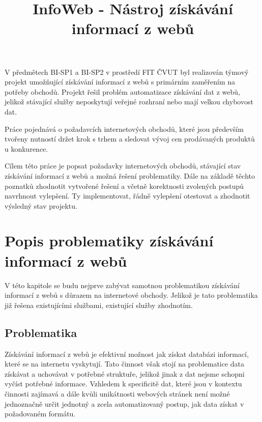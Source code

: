\documentclass[thesis=B,czech]{FITthesis}[2012/06/26]
\title{ InfoWeb - Nástroj získávání informací z webů }
\begin{document}

\begin{introduction}
V předmětech BI-SP1 a BI-SP2 v prostředí FIT ČVUT byl realizován týmový projekt umožňující získávání informací z webů s primárním zaměřením na potřeby obchodů. Projekt řešil problém automatizace získávání dat z webů, jelikož stávající služby neposkytují veřejné rozhraní
nebo mají velkou chybovost dat.
\par
Práce pojednává o požadavcích internetových obchodů, které jsou především tvořeny nutností držet krok s trhem a sledovat vývoj cen
prodávaných produktů u konkurence.
\par
Cílem této práce je popsat požadavky internetových obchodů, stávající stav získávání informací z webů a možná řešení problematiky. Dále na základě těchto poznatků zhodnotit vytvořené řešení a včetně korektnosti zvolených postupů navrhnout vylepšení. Ty implementovat, řádně vylepšení
otestovat a zhodnotit výsledný stav projektu.


\newpage

\end{introduction}


\chapter{Popis problematiky získávání informací z webů}

V této kapitole se budu nejprve zabývat samotnou problematikou získávání informací 
z webů s důrazem na internetové obchody.
Jelikož je tato problematika již řešena existujícími službami, existující služby zhodnotím.

\section{Problematika}
Získávání informací z webů je efektivní možnost jak získat databázi informací, které se na internetu vyskytují.
Tato činnost však stojí na problematice data získávat a uchovávat v potřebné struktuře, jelikož 
jinak z dat nejsme schopni vyčíst potřebné informace.
Vzhledem k specificitě dat, které jsou v kontextu činnosti zajímavá a dále kvůli unikátnosti webových stránek
není možné jednoznačně určit jednotný a zcela automatizovaný postup, jak data získat v požadovaném formátu.
\end{document}
